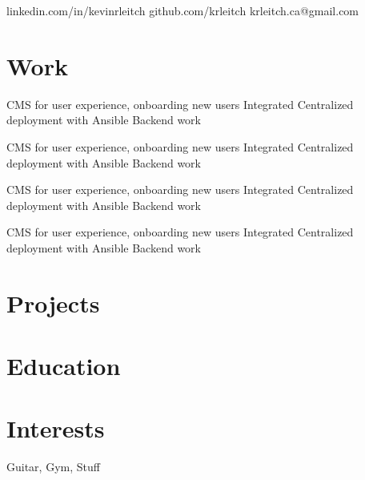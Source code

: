 \documentclass{my_resume}
\begin{document}
        {linkedin.com/in/kevinrleitch}
        {github.com/krleitch}
        {krleitch.ca@gmail.com}

\section{Work}

\workitems
{CMS for user experience, onboarding new users}
{Integrated Centralized deployment with Ansible}
{Backend work}

\workitems
{CMS for user experience, onboarding new users}
{Integrated Centralized deployment with Ansible}
{Backend work}

\workitems
{CMS for user experience, onboarding new users}
{Integrated Centralized deployment with Ansible}
{Backend work}

\workitems
{CMS for user experience, onboarding new users}
{Integrated Centralized deployment with Ansible}
{Backend work}

\section{Projects}

\section{Education}

\section{Interests}
Guitar, Gym, Stuff
\end{document}
